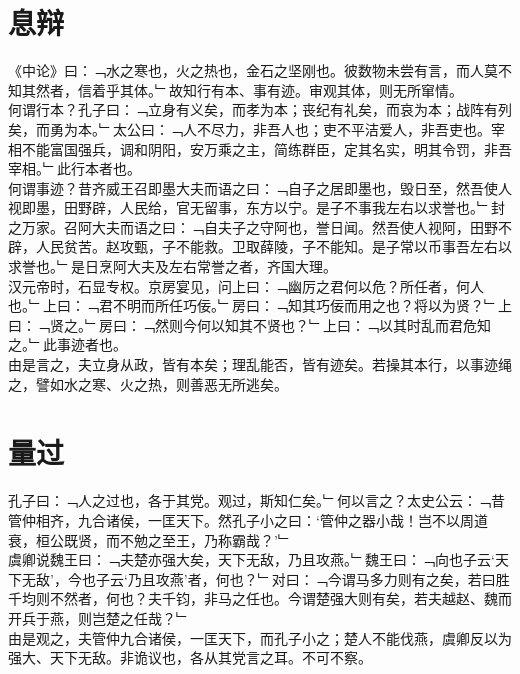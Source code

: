 \chapter{息辩}%
《中论》曰：﹁水之寒也，火之热也，金石之坚刚也。彼数物未尝有言，而人莫不知其然者，信着乎其体。﹂故知行有本、事有迹。审观其体，则无所窜情。\\
何谓行本？孔子曰：﹁立身有义矣，而孝为本；丧纪有礼矣，而哀为本；战阵有列矣，而勇为本。﹂太公曰：﹁人不尽力，非吾人也；吏不平洁爱人，非吾吏也。宰相不能富国强兵，调和阴阳，安万乘之主，简练群臣，定其名实，明其令罚，非吾宰相。﹂此行本者也。\\
何谓事迹？昔齐威王召即墨大夫而语之曰：﹁自子之居即墨也，毁日至，然吾使人视即墨，田野辟，人民给，官无留事，东方以宁。是子不事我左右以求誉也。﹂封之万家。召阿大夫而语之曰：﹁自夫子之守阿也，誉日闻。然吾使人视阿，田野不辟，人民贫苦。赵攻甄，子不能救。卫取薛陵，子不能知。是子常以币事吾左右以求誉也。﹂是日烹阿大夫及左右常誉之者，齐国大理。\\
汉元帝时，石显专权。京房宴见，问上曰：﹁幽厉之君何以危？所任者，何人也。﹂上曰：﹁君不明而所任巧佞。﹂房曰：﹁知其巧佞而用之也？将以为贤？﹂上曰：﹁贤之。﹂房曰：﹁然则今何以知其不贤也？﹂上曰：﹁以其时乱而君危知之。﹂此事迹者也。\\
由是言之，夫立身从政，皆有本矣；理乱能否，皆有迹矣。若操其本行，以事迹绳之，譬如水之寒、火之热，则善恶无所逃矣。
%
%
\chapter{量过}%
孔子曰：﹁人之过也，各于其党。观过，斯知仁矣。﹂何以言之？太史公云：﹁昔管仲相齐，九合诸侯，一匡天下。然孔子小之曰：‘管仲之器小哉！岂不以周道衰，桓公既贤，而不勉之至王，乃称霸哉？’﹂\\
虞卿说魏王曰：﹁夫楚亦强大矣，天下无敌，乃且攻燕。﹂魏王曰：﹁向也子云‘天下无敌’，今也子云‘乃且攻燕’者，何也？﹂对曰：﹁今谓马多力则有之矣，若曰胜千均则不然者，何也？夫千钧，非马之任也。今谓楚强大则有矣，若夫越赵、魏而开兵于燕，则岂楚之任哉？﹂\\
由是观之，夫管仲九合诸侯，一匡天下，而孔子小之；楚人不能伐燕，虞卿反以为强大、天下无敌。非诡议也，各从其党言之耳。不可不察。
%
%
